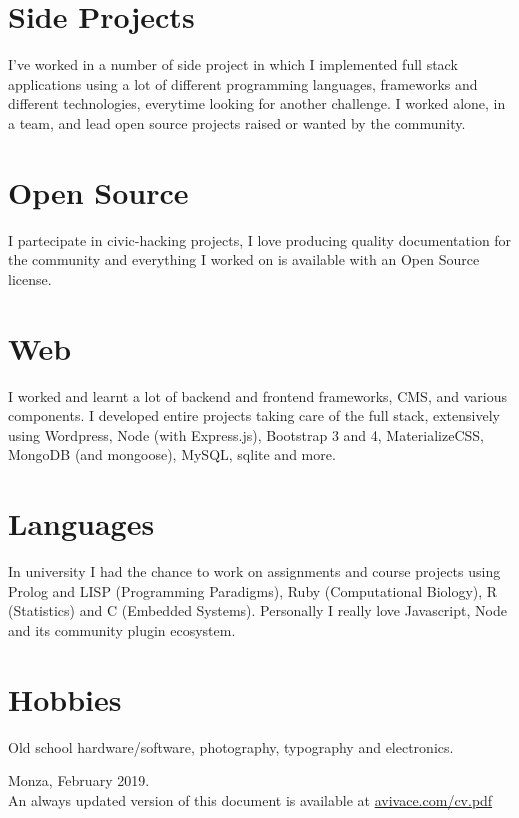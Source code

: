 \documentclass[11pt]{res} %
\begin{document}
\begin{resume}
\begin{itemize}
\end{itemize}

\section{Side Projects}
I've worked in a number of side project in which I implemented full stack applications using a lot of different programming languages, frameworks and different technologies, everytime looking for another challenge. I worked alone, in a team, and lead open source projects raised or wanted by the community.

\section{Open Source}
I partecipate in civic-hacking projects, I love producing quality documentation for the community and everything I worked on is available with an Open Source license.

\section{Web}
I worked and learnt a lot of backend and frontend frameworks, CMS, and various components. I developed entire projects taking care of the full stack, extensively using Wordpress, Node (with Express.js), Bootstrap 3 and 4, MaterializeCSS, MongoDB (and mongoose), MySQL, sqlite and more.

\section{Languages}
In university I had the chance to work on assignments and course projects using Prolog and LISP (Programming Paradigms), Ruby (Computational Biology), R (Statistics) and C (Embedded Systems). Personally I really love Javascript, Node and its community plugin ecosystem.

\section{Hobbies}
Old school hardware/software, photography, typography and electronics. 

\vspace*{\fill}

{\small Monza, February 2019.\\
An always updated version of this document is available at \href{https://avivace.com/cv.pdf}{avivace.com/cv.pdf}}

\end{resume} 
\end{document}
